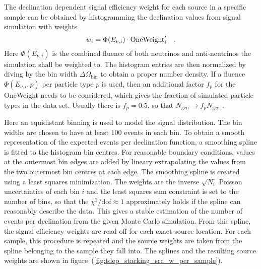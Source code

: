 The declination dependent signal efficiency weight for each source in a specific sample can be obtained by histogramming the declination values from signal simulation with weights
\begin{equation}
  w_i = \Phi(E_{\nu,i})\cdot\text{OneWeight}'_i
  \quad\text{.}
\end{equation}
Here $\Phi(E_{\nu,i})$ is the combined fluence of both neutrinos and anti-neutrinos the simulation shall be weighted to.
The histogram entries are then normalized by diving by the bin width $\Delta\Omega_\text{bin}$ to obtain a proper number density.
If a fluence $\Phi(E_{\nu,i}, p)$ per particle type $p$ is used, then an additional factor $f_p$ for the OneWeight needs to be considered, which gives the fraction of simulated particle types in the data set.
Usually there is $f_p=0.5$, so that $N_\text{gen}\rightarrow f_p N_\text{gen}$ \cite{Gazizov:2004va}.

Here an equidistant binning is used to model the signal distribution.
The bin widths are chosen to have at least $100$ events in each bin.
To obtain a smooth representation of the expected events per declination function, a smoothing spline is fitted to the histogram bin centres.
For reasonable boundary conditions, values at the outermost bin edges are added by lineary extrapolating the values from the two outermost bin centres at each edge.
The smoothing spline is created using a least squares minimization.
The weights are the inverse $\sqrt{N_i}$ Poisson uncertainties of each bin $i$ and the least squares sum constraint is set to the number of bins, so that the $\chi^2 / \text{dof} \approx 1$ approximately holds if the spline can reasonably describe the data.
This gives a stable estimation of the number of events per declination from the given Monte Carlo simulation.
From this spline, the signal efficiency weights are read off for each exact source location.
For each sample, this procedure is repeated and the source weights are taken from the spline belonging to the sample they fall into.
The splines and the resulting source weights are shown in figure~(\ref{fig:tdep_stacking_src_w_per_sample}).


